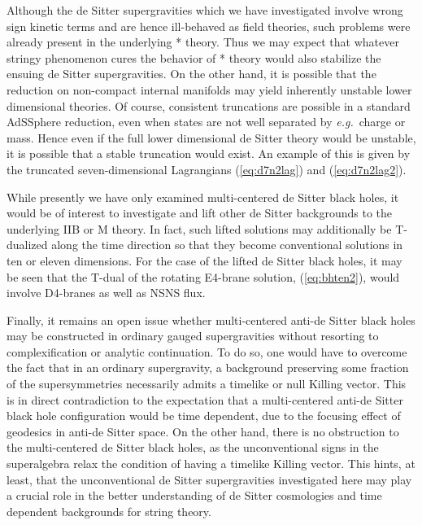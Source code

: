 \documentclass[a4paper,12pt]{article}
\begin{document}
Although the de Sitter supergravities which we have investigated involve
wrong sign kinetic terms and are hence ill-behaved as field theories,
such problems were already present in the underlying * theory.  Thus we
may expect that whatever stringy phenomenon cures the behavior of * theory
would also stabilize the ensuing de Sitter supergravities.  On the other
hand, it is possible that the reduction on non-compact internal
manifolds may yield inherently unstable lower dimensional theories.  Of
course, consistent truncations are possible in a standard AdS\myHighlight{$\times$}\coordHE{}Sphere
reduction, even when states are not well separated by {\it e.g.}~charge
or mass.  Hence even if the full lower dimensional de Sitter theory would
be unstable, it is possible that a stable truncation would exist.  An
example of this is given by the truncated seven-dimensional Lagrangians
(\ref{eq:d7n2lag}) and (\ref{eq:d7n2lag2}).

While presently we have only examined multi-centered de Sitter black
holes, it would be of interest to investigate and lift other de Sitter
backgrounds to the underlying IIB\myHighlight{$^*$}\coordHE{} or M\myHighlight{$^*$}\coordHE{} theory.  In fact, such
lifted solutions may additionally be T-dualized along the time direction
so that they become conventional solutions in ten or eleven dimensions.
For the case of the lifted \coordHE{} de Sitter black holes, it may be seen
that the T-dual of the rotating E4-brane solution, (\ref{eq:bhten2}),
would involve D4-branes as well as NSNS flux.

Finally, it remains an open issue whether multi-centered anti-de Sitter
black holes may be constructed in ordinary gauged supergravities without
resorting to complexification or analytic continuation.  To do so, one
would have to overcome the fact that in an ordinary supergravity, a
background preserving some fraction of the supersymmetries necessarily
admits a timelike or null Killing vector.  This is in direct
contradiction to the expectation that a multi-centered anti-de Sitter
black hole configuration would be time dependent, due to the focusing
effect of geodesics in anti-de Sitter space.  On the other hand, there
is no obstruction to the multi-centered de Sitter black holes, as the
unconventional signs in the superalgebra relax the condition of having a
timelike Killing vector.  This hints, at least, that the unconventional
de Sitter supergravities investigated here may play a crucial role in
the better understanding of de Sitter cosmologies and time dependent
backgrounds for string theory.
\end{document}
